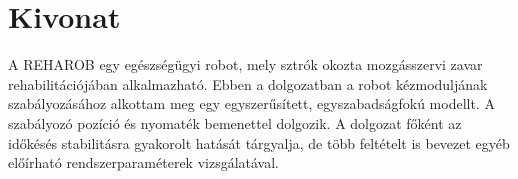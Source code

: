 \cleardoublepage{}
\chapter*{Kivonat}

A REHAROB egy egészségügyi robot, mely sztrók okozta mozgásszervi 
zavar rehabilitációjában alkalmazható. Ebben a dolgozatban a robot 
kézmoduljának szabályozásához alkottam meg egy egyszerűsített, 
egyszabadságfokú modellt. A szabályozó pozíció és nyomaték bemenettel 
dolgozik. A dolgozat főként az időkésés stabilitásra gyakorolt hatását tárgyalja, 
de több feltételt is bevezet egyéb előírható rendszerparaméterek vizsgálatával.